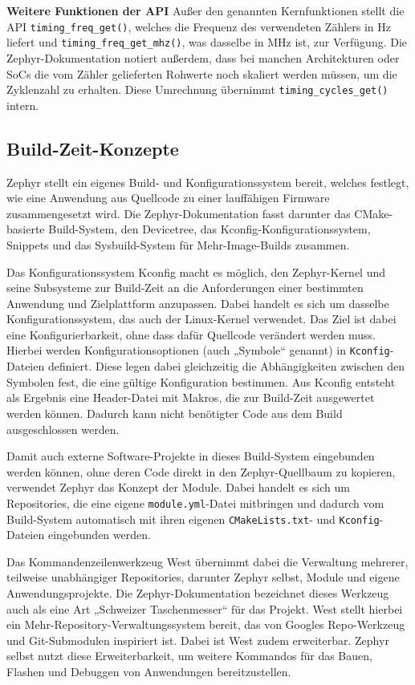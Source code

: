 \textbf{Weitere Funktionen der API} Außer den genannten Kernfunktionen stellt die API \lstinline[style=fileinline]|timing_freq_get()|, welches die Frequenz des verwendeten Zählers in Hz liefert und \lstinline[style=fileinline]|timing_freq_get_mhz()|, was dasselbe in MHz ist, zur Verfügung. Die Zephyr-Dokumentation notiert außerdem, dass bei manchen Architekturen oder SoCs die vom Zähler gelieferten Rohwerte noch skaliert werden müssen, um die Zyklenzahl zu erhalten. Diese Umrechnung übernimmt \lstinline[style=fileinline]|timing_cycles_get()| intern.

\subsection{Build-Zeit-Konzepte}
Zephyr stellt ein eigenes Build- und Konfigurationssystem bereit, welches festlegt, wie eine Anwendung aus Quellcode zu einer lauffähigen Firmware zusammengesetzt wird. Die Zephyr-Dokumentation fasst darunter das CMake-basierte Build-System, den Devicetree, das Kconfig-Konfigurationssystem, Snippets und das Sysbuild-System für Mehr-Image-Builds zusammen.

Das Konfigurationssystem Kconfig macht es möglich, den Zephyr-Kernel und seine Subsysteme zur Build-Zeit an die Anforderungen einer bestimmten Anwendung und Zielplattform anzupassen. Dabei handelt es sich um dasselbe Konfigurationssystem, das auch der Linux-Kernel verwendet. Das Ziel ist dabei eine Konfigurierbarkeit, ohne dass dafür Quellcode verändert werden muss. Hierbei werden Konfigurationsoptionen (auch „Symbole“ genannt) in \lstinline[style=fileinline]|Kconfig|-Dateien definiert. Diese legen dabei gleichzeitig die Abhängigkeiten zwischen den Symbolen fest, die eine gültige Konfiguration bestimmen. Aus Kconfig entsteht als Ergebnis eine Header-Datei mit Makros, die zur Build-Zeit ausgewertet werden können. Dadurch kann nicht benötigter Code aus dem Build ausgeschlossen werden.

Damit auch externe Software-Projekte in dieses Build-System eingebunden werden können, ohne deren Code direkt in den Zephyr-Quellbaum zu kopieren, verwendet Zephyr das Konzept der Module. Dabei handelt es sich um Repositories, die eine eigene \lstinline[style=fileinline]|module.yml|-Datei mitbringen und dadurch vom Build-System automatisch mit ihren eigenen \lstinline[style=fileinline]|CMakeLists.txt|- und \lstinline[style=fileinline]|Kconfig|-Dateien eingebunden werden.

Das Kommandenzeilenwerkzeug West übernimmt dabei die Verwaltung mehrerer, teilweise unabhängiger Repositories, darunter Zephyr selbst, Module und eigene Anwendungsprojekte. Die Zephyr-Dokumentation bezeichnet dieses Werkzeug auch als eine Art „Schweizer Taschenmesser“ für das Projekt. West stellt hierbei ein Mehr-Repository-Verwaltungssystem bereit, das von Googles Repo-Werkzeug und Git-Submodulen inspiriert ist. Dabei ist West zudem erweiterbar. Zephyr selbst nutzt diese Erweiterbarkeit, um weitere Kommandos für das Bauen, Flashen und Debuggen von Anwendungen bereitzustellen.


